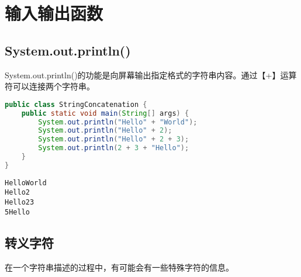 \newpage

\section{输入输出函数}

\subsection{System.out.println()}

System.out.println()的功能是向屏幕输出指定格式的字符串内容。通过【+】运算符可以连接两个字符串。\\


\begin{lstlisting}[language=Java]
public class StringConcatenation {
	public static void main(String[] args) {
		System.out.println("Hello" + "World");
		System.out.println("Hello" + 2);
		System.out.println("Hello" + 2 + 3);
		System.out.println(2 + 3 + "Hello");
	}
}
\end{lstlisting}

\begin{tcolorbox}
	\begin{verbatim}
HelloWorld
Hello2
Hello23
5Hello
	\end{verbatim}
\end{tcolorbox}

\vspace{0.5cm}

\subsection{转义字符}

在一个字符串描述的过程中，有可能会有一些特殊字符的信息。

\begin{table}[H]
	\centering
	\caption{转义字符}
\end{table}

